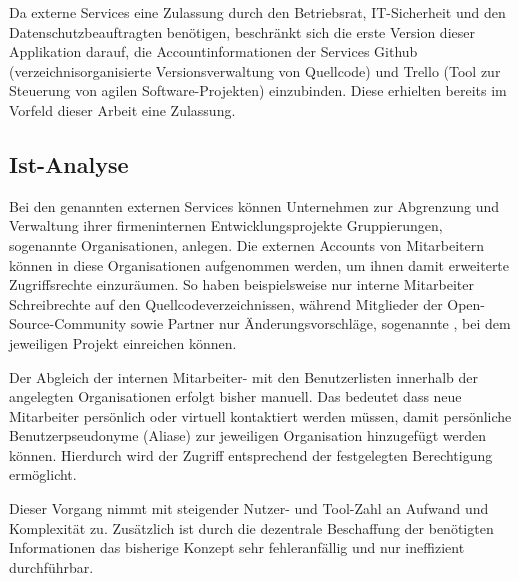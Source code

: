 Da externe Services eine Zulassung durch den Betriebsrat, IT-Sicherheit und den Datenschutzbeauftragten
benötigen, beschränkt sich die erste Version dieser Applikation darauf, die Accountinformationen der
Services Github (verzeichnisorganisierte Versionsverwaltung von Quellcode) und Trello
(Tool zur Steuerung von agilen Software-Projekten) einzubinden. Diese erhielten bereits im Vorfeld
dieser Arbeit eine Zulassung.

\subsection{Ist-Analyse}
\label{sec:Ist-Analyse}
Bei den genannten externen Services können Unternehmen zur Abgrenzung und
Verwaltung ihrer firmeninternen Entwicklungsprojekte Gruppierungen, sogenannte Organisationen, anlegen.
Die externen Accounts von Mitarbeitern können in diese Organisationen aufgenommen werden,
um ihnen damit erweiterte Zugriffsrechte einzuräumen.
So haben beispielsweise nur interne Mitarbeiter Schreibrechte auf den Quellcodeverzeichnissen, während
Mitglieder der Open-Source-Community sowie Partner nur Änderungsvorschläge, sogenannte
, bei dem jeweiligen Projekt einreichen können.

Der Abgleich der internen Mitarbeiter- mit den Benutzerlisten innerhalb der angelegten Organisationen
erfolgt bisher manuell. Das bedeutet dass neue Mitarbeiter persönlich oder virtuell
kontaktiert werden müssen, damit persönliche Benutzerpseudonyme (Aliase) zur jeweiligen Organisation hinzugefügt
werden können. Hierdurch wird der Zugriff entsprechend der festgelegten Berechtigung ermöglicht.

Dieser Vorgang nimmt mit steigender Nutzer- und Tool-Zahl an Aufwand und Komplexität zu.
Zusätzlich ist durch die dezentrale Beschaffung der benötigten Informationen das bisherige
Konzept sehr fehleranfällig und nur ineffizient durchführbar.

